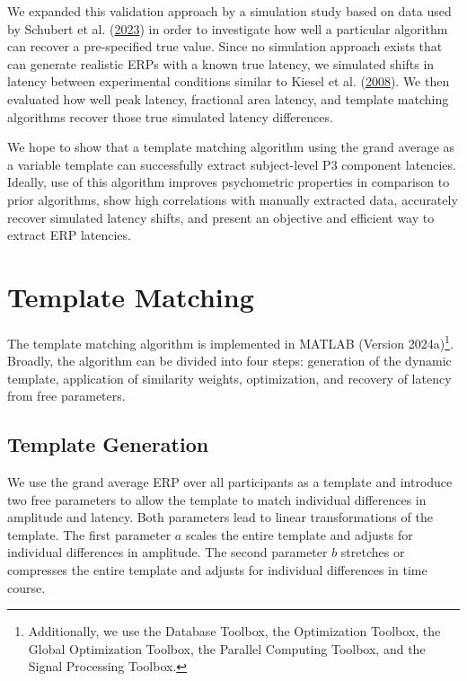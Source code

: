 \documentclass[
  man]{apa7}
\begin{document}
We expanded this validation approach by a simulation study based on data used by Schubert et al. (\protect\hyperlink{ref-schubert2023robust}{2023}) in order to investigate how well a particular algorithm can recover a pre-specified true value. Since no simulation approach exists that can generate realistic ERPs with a known true latency, we simulated shifts in latency between experimental conditions similar to Kiesel et al. (\protect\hyperlink{ref-kiesel2008measurement}{2008}). We then evaluated how well peak latency, fractional area latency, and template matching algorithms recover those true simulated latency differences.

We hope to show that a template matching algorithm using the grand average as a variable template can successfully extract subject-level P3 component latencies. Ideally, use of this algorithm improves psychometric properties in comparison to prior algorithms, show high correlations with manually extracted data, accurately recover simulated latency shifts, and present an objective and efficient way to extract ERP latencies.

\hypertarget{template-matching-1}{%
\section{Template Matching}\label{template-matching-1}}

The template matching algorithm is implemented in MATLAB (Version 2024a)\footnote{Additionally, we use the Database Toolbox, the Optimization Toolbox, the Global Optimization Toolbox, the Parallel Computing Toolbox, and the Signal Processing Toolbox.}. Broadly, the algorithm can be divided into four steps: generation of the dynamic template, application of similarity weights, optimization, and recovery of latency from free parameters.

\hypertarget{template-generation}{%
\subsection{Template Generation}\label{template-generation}}

We use the grand average ERP over all participants as a template and introduce two free parameters to allow the template to match individual differences in amplitude and latency. Both parameters lead to linear transformations of the template. The first parameter \(a\) scales the entire template and adjusts for individual differences in amplitude. The second parameter \(b\) stretches or compresses the entire template and adjusts for individual differences in time course.
\end{document}
